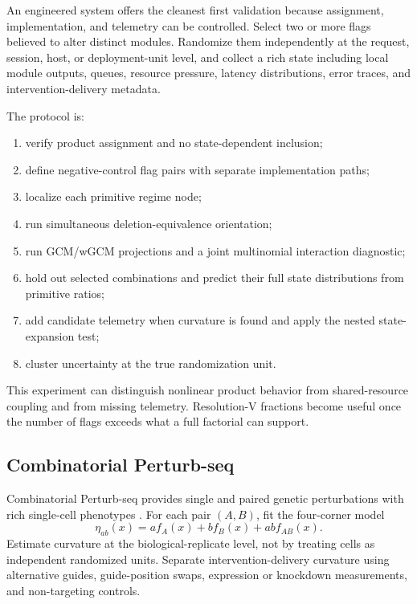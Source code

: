 \documentclass[11pt]{article}
\begin{document}
An engineered system offers the cleanest first validation because assignment, implementation, and telemetry can be controlled.  Select two or more flags believed to alter distinct modules.  Randomize them independently at the request, session, host, or deployment-unit level, and collect a rich state including local module outputs, queues, resource pressure, latency distributions, error traces, and intervention-delivery metadata.

The protocol is:
\begin{enumerate}
\item verify product assignment and no state-dependent inclusion;
\item define negative-control flag pairs with separate implementation paths;
\item localize each primitive regime node;
\item run simultaneous deletion-equivalence orientation;
\item run GCM/wGCM projections and a joint multinomial interaction diagnostic;
\item hold out selected combinations and predict their full state distributions from primitive ratios;
\item add candidate telemetry when curvature is found and apply the nested state-expansion test;
\item cluster uncertainty at the true randomization unit.
\end{enumerate}

This experiment can distinguish nonlinear product behavior from shared-resource coupling and from missing telemetry.  Resolution-V fractions become useful once the number of flags exceeds what a full factorial can support.

\subsection{Combinatorial Perturb-seq}

Combinatorial Perturb-seq provides single and paired genetic perturbations with rich single-cell phenotypes \citep{norman2019perturbseq}.  For each pair \((A,B)\), fit the four-corner model
\begin{equation}
\eta_{ab}(x)=af_A(x)+bf_B(x)+abf_{AB}(x).
\end{equation}
Estimate curvature at the biological-replicate level, not by treating cells as independent randomized units.  Separate intervention-delivery curvature using alternative guides, guide-position swaps, expression or knockdown measurements, and non-targeting controls.
\end{document}
